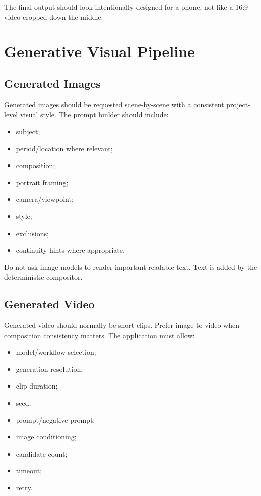\documentclass[10pt,journal,compsoc]{IEEEtran}
\begin{document}
The final output should look intentionally designed for a phone, not like a 16:9 video cropped down the middle.

\section{Generative Visual Pipeline}

\subsection{Generated Images}

Generated images should be requested scene-by-scene with a consistent project-level visual style. The prompt builder should include:
\begin{itemize}
    \item subject;
    \item period/location where relevant;
    \item composition;
    \item portrait framing;
    \item camera/viewpoint;
    \item style;
    \item exclusions;
    \item continuity hints where appropriate.
\end{itemize}

Do not ask image models to render important readable text. Text is added by the deterministic compositor.

\subsection{Generated Video}

Generated video should normally be short clips. Prefer image-to-video when composition consistency matters. The application must allow:
\begin{itemize}
    \item model/workflow selection;
    \item generation resolution;
    \item clip duration;
    \item seed;
    \item prompt/negative prompt;
    \item image conditioning;
    \item candidate count;
    \item timeout;
    \item retry.
\end{itemize}
\end{document}
